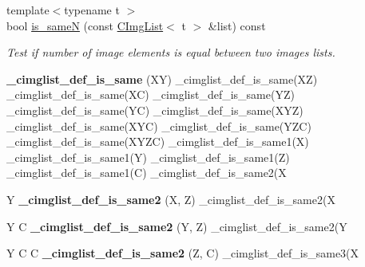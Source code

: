 \begin{DoxyCompactItemize}
{\footnotesize template$<$typename t $>$ }\\bool \hyperlink{structcimg__library__suffixed_1_1CImgList_aaa88cf845cbf40eb56c6f6cc7214475e}{is\+\_\+sameN} (const \hyperlink{structcimg__library__suffixed_1_1CImgList}{C\+Img\+List}$<$ t $>$ \&list) const
\begin{DoxyCompactList}\small\item\em Test if number of image elements is equal between two images lists. \end{DoxyCompactList}\item 
\mbox{\label{structcimg__library__suffixed_1_1CImgList_aa1ff1c8222f2113cac3da3e5da23d8e6}} 
{\bfseries \+\_\+cimglist\+\_\+def\+\_\+is\+\_\+same} (XY) \+\_\+cimglist\+\_\+def\+\_\+is\+\_\+same(XZ) \+\_\+cimglist\+\_\+def\+\_\+is\+\_\+same(XC) \+\_\+cimglist\+\_\+def\+\_\+is\+\_\+same(YZ) \+\_\+cimglist\+\_\+def\+\_\+is\+\_\+same(YC) \+\_\+cimglist\+\_\+def\+\_\+is\+\_\+same(X\+YZ) \+\_\+cimglist\+\_\+def\+\_\+is\+\_\+same(X\+YC) \+\_\+cimglist\+\_\+def\+\_\+is\+\_\+same(Y\+ZC) \+\_\+cimglist\+\_\+def\+\_\+is\+\_\+same(X\+Y\+ZC) \+\_\+cimglist\+\_\+def\+\_\+is\+\_\+same1(X) \+\_\+cimglist\+\_\+def\+\_\+is\+\_\+same1(Y) \+\_\+cimglist\+\_\+def\+\_\+is\+\_\+same1(Z) \+\_\+cimglist\+\_\+def\+\_\+is\+\_\+same1(C) \+\_\+cimglist\+\_\+def\+\_\+is\+\_\+same2(X
\item 
\mbox{\label{structcimg__library__suffixed_1_1CImgList_a679e3c3e6e85c229355520dfe7c19395}} 
Y {\bfseries \+\_\+cimglist\+\_\+def\+\_\+is\+\_\+same2} (X, Z) \+\_\+cimglist\+\_\+def\+\_\+is\+\_\+same2(X
\item 
\mbox{\label{structcimg__library__suffixed_1_1CImgList_abafaf5d08916ebb03aeafa5ce32f4221}} 
Y C {\bfseries \+\_\+cimglist\+\_\+def\+\_\+is\+\_\+same2} (Y, Z) \+\_\+cimglist\+\_\+def\+\_\+is\+\_\+same2(Y
\item 
\mbox{\label{structcimg__library__suffixed_1_1CImgList_a9783ed0a524a56e21a5f721758873299}} 
Y C C {\bfseries \+\_\+cimglist\+\_\+def\+\_\+is\+\_\+same2} (Z, C) \+\_\+cimglist\+\_\+def\+\_\+is\+\_\+same3(X
\item 
\mbox{\label{structcimg__library__suffixed_1_1CImgList_a31ad10850ad4139e69f4f9bc884f6342}} 

\end{DoxyCompactItemize}
